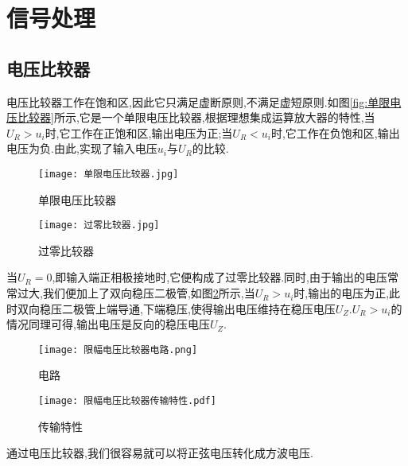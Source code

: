 \section{\K 信号处理}
\subsection{\K 电压比较器}
\Par 电压比较器工作在饱和区,因此它只满足虚断原则,不满足虚短原则.如图\ref{fig:单限电压比较器}所示,它是一个单限电压比较器,根据理想集成运算放大器的特性,当$U_R>u_i$时,它工作在正饱和区,输出电压为正;当$U_R<u_i$时,它工作在负饱和区,输出电压为负.由此,实现了输入电压$u_i$与$U_R$的比较.
\begin{figure}[htbp]
	\centering
	\begin{minipage}[b]{0.48\textwidth}
        \texttt{[image: 单限电压比较器.jpg]}
	    \caption{单限电压比较器}
	    \label{fig:单限电压比较器}
    \end{minipage}
    \begin{minipage}[b]{0.48\textwidth}
        \texttt{[image: 过零比较器.jpg]}
	    \caption{过零比较器}
	    \label{fig:过零比较器}
    \end{minipage}
\end{figure}

\Par 当$U_R=0$,即输入端正相极接地时,它便构成了过零比较器.同时,由于输出的电压常常过大,我们便加上了双向稳压二极管,如图\ref{fig:限幅电压比较器传输特性}所示,当$U_R>u_i$时,输出的电压为正,此时双向稳压二极管上端导通,下端稳压,使得输出电压维持在稳压电压$U_Z$.$U_R>u_i$的情况同理可得,输出电压是反向的稳压电压$U_Z$.

\begin{figure}[htbp]
	\centering
	\begin{minipage}[b]{0.48\textwidth}
        \texttt{[image: 限幅电压比较器电路.png]}
	    \caption{电路}
	    \label{fig:限幅电压比较器电路}
    \end{minipage}
    \begin{minipage}[b]{0.48\textwidth}
        \texttt{[image: 限幅电压比较器传输特性.pdf]}
	    \caption{传输特性}
	    \label{fig:限幅电压比较器传输特性}
    \end{minipage}
\end{figure}
\Par 通过电压比较器,我们很容易就可以将正弦电压转化成方波电压.
